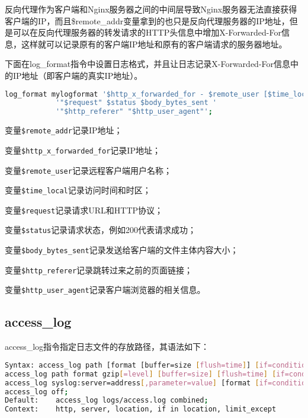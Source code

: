 反向代理作为客户端和Nginx服务器之间的中间层导致Nginx服务器无法直接获得客户端的IP，而且\$remote\_addr变量拿到的也只是反向代理服务器的IP地址，但是可以在反向代理服务器的转发请求的HTTP头信息中增加X-Forwarded-For信息，这样就可以记录原有的客户端IP地址和原有的客户端请求的服务器地址。

下面在log\_format指令中设置日志格式，并且让日志记录X-Forwarded-For信息中的IP地址（即客户端的真实IP地址）。

\begin{lstlisting}[language=bash]
log_format mylogformat '$http_x_forwarded_for - $remote_user [$time_local] '
			'"$request" $status $body_bytes_sent '
			'"$http_referer" "$http_user_agent"';
\end{lstlisting}

\begin{compactitem}
\item 变量\texttt{\$remote\_addr}记录IP地址；
\item 变量\texttt{\$http\_x\_forwarded\_for}记录IP地址；
\item 变量\texttt{\$remote\_user}记录远程客户端用户名称；
\item 变量\texttt{\$time\_local}记录访问时间和时区；
\item 变量\texttt{\$request}记录请求URL和HTTP协议；
\item 变量\texttt{\$status}记录请求状态，例如200代表请求成功；
\item 变量\texttt{\$body\_bytes\_sent}记录发送给客户端的文件主体内容大小；
\item 变量\texttt{\$http\_referer}记录跳转过来之前的页面链接；
\item 变量\texttt{\$http\_user\_agent}记录客户端浏览器的相关信息。
\end{compactitem}



\subsection{access\_log}


access\_log指令指定日志文件的存放路径，其语法如下：



\begin{lstlisting}[language=bash]
Syntax:	access_log path [format [buffer=size [flush=time]] [if=condition]];
access_log path format gzip[=level] [buffer=size] [flush=time] [if=condition];
access_log syslog:server=address[,parameter=value] [format [if=condition]];
access_log off;
Default:	access_log logs/access.log combined;
Context:	http, server, location, if in location, limit_except
\end{lstlisting}

